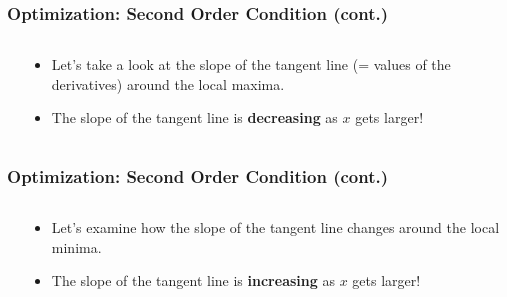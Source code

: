 \documentclass[pdflatex, 12pt]{beamer}
\begin{document}
\begin{frame}
\frametitle{Optimization: Second Order Condition (cont.)}
\begin{columns}
\begin{column}{0.5\textwidth}
\end{column}
\begin{column}{0.5\textwidth}
\begin{itemize}
\item Let's take a look at the slope of the tangent line (= values of the derivatives) around the local maxima.
\vspace{0.4cm}
\item The slope of the tangent line is \textbf{decreasing} as $x$ gets larger!
\end{itemize}
\end{column}
\end{columns}
\end{frame}

\begin{frame}
\frametitle{Optimization: Second Order Condition (cont.)}
\begin{columns}
\begin{column}{0.5\textwidth}
\end{column}
\begin{column}{0.5\textwidth}
\begin{itemize}
\item Let's examine how the slope of the tangent line changes around the local minima.
\vspace{0.4cm}
\item The slope of the tangent line is \textbf{increasing} as $x$ gets larger!
\end{itemize}
\end{column}
\end{columns}
\end{frame}
\end{document}
